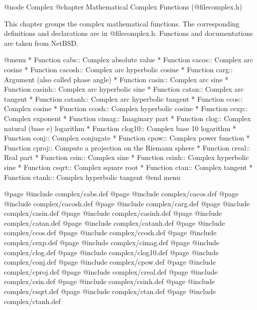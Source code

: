 @node Complex
@chapter Mathematical Complex Functions (@file{complex.h})

This chapter groups the complex mathematical functions.  The
corresponding definitions and declarations are in @file{complex.h}.  
Functions and documentations are taken from NetBSD.

@menu 
* Function cabs::	Complex absolute value
* Function cacos::	Complex arc cosine
* Function cacosh::	Complex arc hyperbolic cosine
* Function carg::	Argument (also called phase angle)
* Function casin::	Complex arc sine
* Function casinh::	Complex arc hyperbolic sine
* Function catan::	Complex arc tangent
* Function catanh::	Complex arc hyperbolic tangent
* Function ccos::	Complex cosine
* Function ccosh::	Complex hyperbolic cosine
* Function cexp::	Complex exponent
* Function cimag::	Imaginary part
* Function clog::	Complex natural (base e) logarithm
* Function clog10::	Complex base 10 logarithm
* Function conj::	Complex conjugate
* Function cpow::	Complex power function
* Function cproj::	Compute a projection on the Riemann sphere
* Function creal::	Real part
* Function csin::	Complex sine
* Function csinh::	Complex hyperbolic sine
* Function csqrt::	Complex square root
* Function ctan::	Complex tangent
* Function ctanh::	Complex hyperbolic tangent
@end menu

@page
@include   complex/cabs.def
@page
@include   complex/cacos.def
@page
@include   complex/cacosh.def
@page
@include   complex/carg.def
@page
@include   complex/casin.def
@page
@include   complex/casinh.def
@page
@include   complex/catan.def
@page
@include   complex/catanh.def
@page
@include   complex/ccos.def
@page
@include   complex/ccosh.def
@page
@include   complex/cexp.def
@page
@include   complex/cimag.def
@page
@include   complex/clog.def
@page
@include   complex/clog10.def
@page
@include   complex/conj.def
@page
@include   complex/cpow.def
@page
@include   complex/cproj.def
@page
@include   complex/creal.def
@page
@include   complex/csin.def
@page
@include   complex/csinh.def
@page
@include   complex/csqrt.def
@page
@include   complex/ctan.def
@page
@include   complex/ctanh.def
